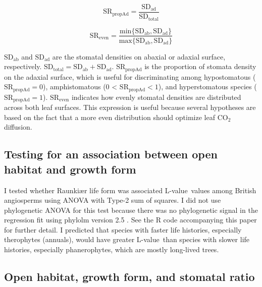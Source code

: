 \documentclass[12pt, oneside]{article}
\newcommand{\pkg}[1]{{\fontseries{b}\selectfont #1}}
\newcommand{\el}{L-value}
\begin{document}
\begin{equation} \label{eq:SRpropAd} 
  \mathrm{SR_{propAd}} = \frac{\mathrm{SD_{ad}}}{\mathrm{SD_{total}}}
\end{equation}

\begin{equation} \label{eq:SReven1} 
  \mathrm{SR_{even}} = \frac{\mathrm{min}\{\mathrm{SD_{ab}}, \mathrm{SD_{ad}}\}}{\mathrm{max}\{\mathrm{SD_{ab}}, \mathrm{SD_{ad}}\}}
\end{equation}

$\mathrm{SD_{ab}}$ and $\mathrm{SD_{ad}}$ are the stomatal densities on abaxial or adaxial surface, respectively. $\mathrm{SD_{total}} = \mathrm{SD_{ab}} + \mathrm{SD_{ad}}$. $\mathrm{SR_{propAd}}$ is the proportion of stomata density on the adaxial surface, which is useful for discriminating among hypostomatous ($\mathrm{SR_{propAd}} = 0$), amphistomatous (0 < $\mathrm{SR_{propAd}} < 1$), and hyperstomatous species ($\mathrm{SR_\mathrm{propAd}} = 1$). $\mathrm{SR_\mathrm{even}}$ indicates how evenly stomatal densities are distributed across both leaf surfaces. This expression is useful because several hypotheses are based on the fact that a more even distribution should optimize leaf CO$_2$ diffusion.



\subsection*{Testing for an association between open habitat and growth form}

I tested whether Raunki\ae r life form was associated \el~values among British angiosperms using ANOVA with Type-2 sum of squares. I did not use phylogenetic ANOVA for this test because there was no phylogenetic signal in the regression fit using \pkg{phylolm} version 2.5 \citep{Ho_Ane_2014}. See the R code accompanying this paper for further detail. I predicted that species with faster life histories, especially therophytes (annuals), would have greater \el~than species with slower life histories, especially phanerophytes, which are mostly long-lived trees. 

\subsection*{Open habitat, growth form, and stomatal ratio}
\end{document}
